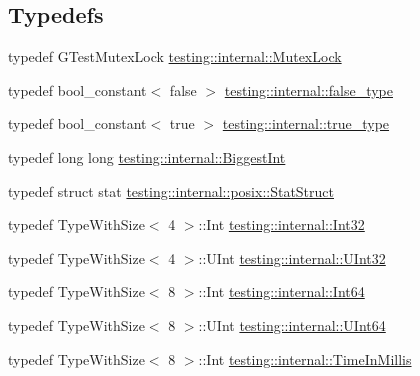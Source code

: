 \subsection*{Typedefs}
\begin{DoxyCompactItemize}
\item 
typedef G\+Test\+Mutex\+Lock \mbox{\hyperlink{namespacetesting_1_1internal_a08b187c6cc4e28400aadf9a32fccc8de}{testing\+::internal\+::\+Mutex\+Lock}}
\item 
typedef bool\+\_\+constant$<$ false $>$ \mbox{\hyperlink{namespacetesting_1_1internal_a91e570bc966cc243d784dbb550bbbe7d}{testing\+::internal\+::false\+\_\+type}}
\item 
typedef bool\+\_\+constant$<$ true $>$ \mbox{\hyperlink{namespacetesting_1_1internal_a0189db17b0bd7e74f149d460ea9531a5}{testing\+::internal\+::true\+\_\+type}}
\item 
typedef long long \mbox{\hyperlink{namespacetesting_1_1internal_a05c6bd9ede5ccdf25191a590d610dcc6}{testing\+::internal\+::\+Biggest\+Int}}
\item 
typedef struct stat \mbox{\hyperlink{namespacetesting_1_1internal_1_1posix_a8eb9f08d3af29941c2d2a964cfff3ecb}{testing\+::internal\+::posix\+::\+Stat\+Struct}}
\item 
typedef Type\+With\+Size$<$ 4 $>$\+::Int \mbox{\hyperlink{namespacetesting_1_1internal_af89e21e4043b5cf0c120af487b24fa06}{testing\+::internal\+::\+Int32}}
\item 
typedef Type\+With\+Size$<$ 4 $>$\+::U\+Int \mbox{\hyperlink{namespacetesting_1_1internal_a436defbb8e92c8e94e33ebcc86f278ba}{testing\+::internal\+::\+U\+Int32}}
\item 
typedef Type\+With\+Size$<$ 8 $>$\+::Int \mbox{\hyperlink{namespacetesting_1_1internal_abd4adb4f2e2d7078a473de91a4089501}{testing\+::internal\+::\+Int64}}
\item 
typedef Type\+With\+Size$<$ 8 $>$\+::U\+Int \mbox{\hyperlink{namespacetesting_1_1internal_ad24ae0a18ae0d3758b9a8333a0b56a4b}{testing\+::internal\+::\+U\+Int64}}
\item 
typedef Type\+With\+Size$<$ 8 $>$\+::Int \mbox{\hyperlink{namespacetesting_1_1internal_a5eed833eddf9ea8ca45546c125f4ef0c}{testing\+::internal\+::\+Time\+In\+Millis}}
\end{DoxyCompactItemize}
